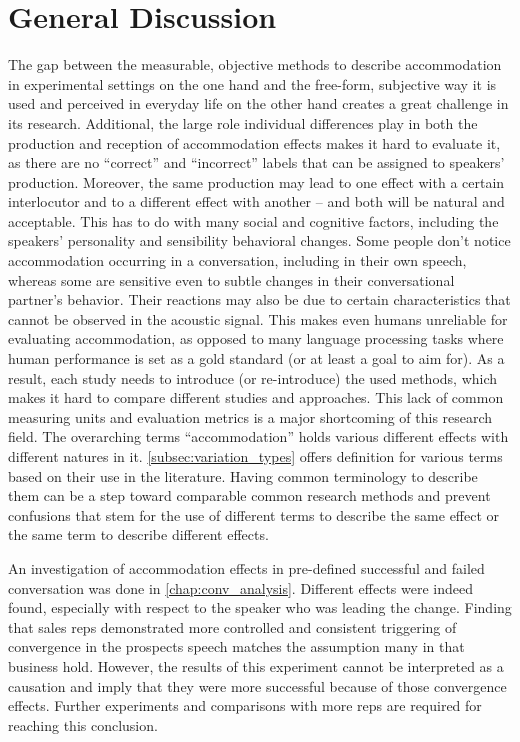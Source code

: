 \chapter*{General Discussion}
\label{chap:general_discussion}


\acresetall

The gap between the measurable, objective methods to describe accommodation in experimental settings on the one hand and the free-form, subjective way it is used and perceived in everyday life on the other hand creates a great challenge in its research.
Additional, the large role individual differences play in both the production and reception of accommodation effects makes it hard to evaluate it, as there are no \enquote{correct} and \enquote{incorrect} labels that can be assigned to speakers' production.
Moreover, the same production may lead to one effect with a certain interlocutor and to a different effect with another -- and both will be natural and acceptable.
This has to do with many social and cognitive factors, including the speakers' personality and sensibility behavioral changes.
Some people don't notice accommodation occurring in a conversation, including in their own speech, whereas some are sensitive even to subtle changes in their conversational partner's behavior.
Their reactions may also be due to certain characteristics that cannot be observed in the acoustic signal.
This makes even humans unreliable for evaluating accommodation, as opposed to many language processing tasks where human performance is set as a gold standard (or at least a goal to aim for).
As a result, each study needs to introduce (or re-introduce) the used methods, which makes it hard to compare different studies and approaches.
This lack of common measuring units and evaluation metrics is a major shortcoming of this research field.
The overarching terms \enquote{accommodation} holds various different effects with different natures in it.
\cref{subsec:variation_types} offers definition for various terms based on their use in the literature.
Having common terminology to describe them can be a step toward comparable common research methods and prevent confusions that stem for the use of different terms to describe the same effect or the same term to describe different effects. 

An investigation of accommodation effects in pre-defined successful and failed conversation was done in \cref{chap:conv_analysis}.
Different effects were indeed found, especially with respect to the speaker who was leading the change.
Finding that sales reps demonstrated more controlled and consistent triggering of convergence in the prospects speech matches the assumption many in that business hold.
However, the results of this experiment cannot be interpreted as a causation and imply that they were more successful because of those convergence effects.
Further experiments and comparisons with more reps are required for reaching this conclusion.

